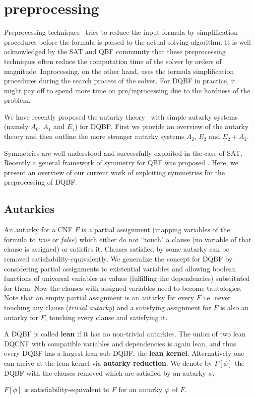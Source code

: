 \documentclass[conference]{IEEEtran}
\begin{document}
\section{preprocessing}
\label{sec:pre}
Preprocessing techniques~\cite{een2005effective} tries to reduce the input formula by simplification procedures before the formula is passed to the actual solving algorithm.
%
It is well acknowledged by the SAT and QBF community that these preprocessing techniques often reduce the computation time of the solver by orders of magnitude.
%
Inprocessing, on the other hand, uses the formula simplification procedures during the search process of the solver. 
%
For DQBF in practice, it might pay off to spend
more time on pre/inprocessing due to the hardness of the problem.

We have recently proposed the autarky theory~\cite{oliverfmcad} with simple autarky systems (namely $A_0$, $A_1$ and $E_1$) for DQBF. 
%
First we provide an overview of the autarky theory and then outline the more stronger autarky systems $A_2$, $E_2$ and $E_2 + A_2$. 
%

Symmetries are well understood and successfully exploited in the case of SAT. 
%
Recently a general framework of symmetry for QBF was proposed \cite{kauers2018symmetries}.
%
Here, we present an overview of our current work of exploiting symmetries for the preprocessing of DQBF.   

\subsection{Autarkies}
\label{sec:aut}
An autarky for a CNF $F$ is a partial assignment (mapping variables of the formula to \textit{true} or \textit{false}) which either do not ``touch" a clause (no variable of that clause is assigned) or satisfies it.
%
Clauses satisfied by some autarky can be removed satisfiability-equivalently. 
%
We generalize the concept for DQBF by considering partial assignments to existential variables and allowing boolean functions of universal variables as values (fulfilling the dependencies) substituted for them.
%
Now the clauses with assigned variables need to become tautologies.
%
Note that an empty partial assignment is an autarky for every $F$ i.e. never touching any clause (\textit{trivial autarky}) and a satisfying assignment for $F$ is also an autarky for $F$, touching every clause and satisfying it.

A DQBF is called \textbf{lean} if it has no non-trivial autarkies.
The union of two lean DQCNF with compatible variables and dependencies is again lean, and thus every DQBF has a largest lean sub-DQBF, the \textbf{lean kernel}.
%
Alternatively one can arrive at the lean kernel via \textbf{autarky reduction}.
%
We denote by $F[\phi]$ the DQBF with the clauses removed which are satisfied by an autarky $\phi$. \vspace{-1em}
\begin{lem}\label{lem:autsateq}
	$F[\phi]$ is satisfiability-equivalent to $F$ for an autarky $\varphi$ of $F$.
\end{lem}
\end{document}

